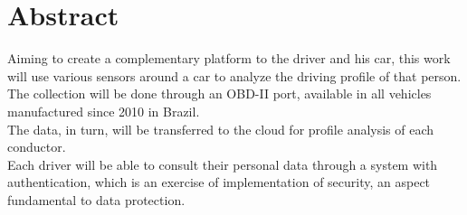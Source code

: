 \chapter*{Abstract}


\noindent Aiming to create a complementary platform to the driver and his car, this work will use various sensors around a car to analyze the driving profile of that person. \\
The collection will be done through an OBD-II port, available in all vehicles manufactured since 2010 in Brazil. \\
The data, in turn, will be transferred to the cloud for profile analysis of each conductor. \\
Each driver will be able to consult their personal data through a system with authentication, which is an exercise of implementation of security, an aspect fundamental to data protection.